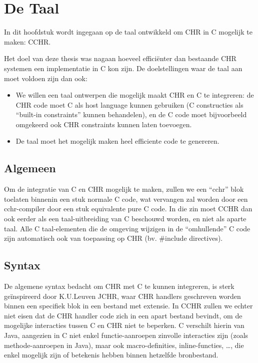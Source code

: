 \chapter{De Taal} \label{chap:taal}

In dit hoofdstuk wordt ingegaan op de taal ontwikkeld om CHR in C mogelijk te maken: CCHR.

Het doel van deze thesis was nagaan hoeveel effici\"enter dan bestaande CHR systemen een implementatie
in C kon zijn. De doelstellingen waar de taal aan moet voldoen zijn dan ook: \begin{itemize}
  \item We willen een taal ontwerpen die mogelijk maakt CHR en C te integreren: de CHR code moet C
        als host language kunnen gebruiken (C constructies als ``built-in constraints'' kunnen
	behandelen), en de C code moet bijvoorbeeld omgekeerd ook CHR constraints kunnen laten toevoegen.
  \item De taal moet het mogelijk maken heel efficiente code te genereren.
\end{itemize}

\section{Algemeen} \label{sec:taal-gen}

Om de integratie van C en CHR mogelijk te maken, zullen we een ``cchr'' blok toelaten binnenin een stuk normale C code, wat vervangen zal worden door een cchr-compiler door een stuk equivalente pure C code. In die zin moet CCHR dan ook eerder als een taal-uitbreiding van C beschouwd worden, en niet als aparte taal. Alle C taal-elementen die de omgeving wijzigen in de ``omhullende'' C code zijn automatisch ook van toepassing op CHR (bv. \#include directives). 

\section{Syntax} \label{sec:taal-syn}

De algemene syntax bedacht om CHR met C te kunnen integreren, is sterk ge\"inspireerd door K.U.Leuven JCHR, waar CHR handlers geschreven worden binnen een specifiek blok in een bestand met  extensie. In CCHR zullen we echter niet eisen dat de CHR handler code zich in een apart bestand bevindt, om de mogelijke interacties tussen C en CHR niet te beperken. C verschilt hierin van Java, aangezien in C niet enkel functie-aanroepen zinvolle interacties zijn (zoals methode-aanroepen in Java), maar ook macro-definities, inline-functies, \ldots, die enkel mogelijk zijn of betekenis hebben binnen hetzelfde bronbestand.

